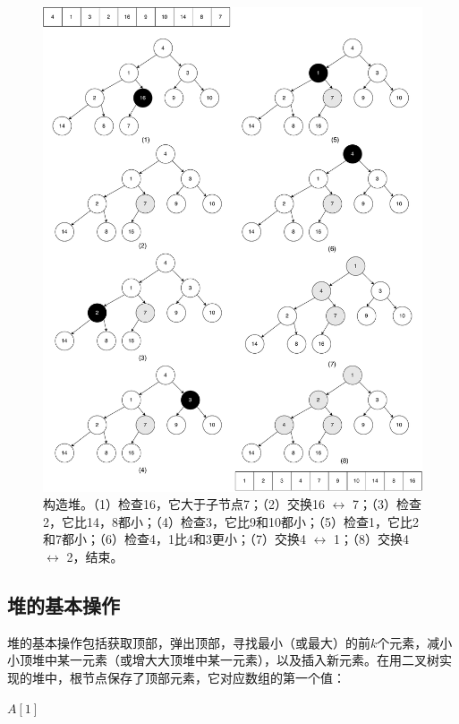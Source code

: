 \documentclass[b5paper]{ctexart}
\begin{document}
\begin{figure}[htbp]
  \centering
  \includegraphics[scale=0.4]{img/build-heap}
  \caption{构造堆。（1）检查16，它大于子节点7；（2）交换16 $\leftrightarrow$ 7；（3）检查2，它比14，8都小；（4）检查3，它比9和10都小；（5）检查1，它比2和7都小；（6）检查4，1比4和3更小；（7）交换4 $\leftrightarrow$ 1；（8）交换4 $\leftrightarrow$ 2，结束。}
  \label{fig:build-heap-3}
\end{figure}

\subsection{堆的基本操作}

堆的基本操作包括获取顶部，弹出顶部，寻找最小（或最大）的前$k$个元素，减小小顶堆中某一元素（或增大大顶堆中某一元素），以及插入新元素。在用二叉树实现的堆中，根节点保存了顶部元素，它对应数组的第一个值：

\begin{algorithmic}[1]
  \State \Return $A[1]$
\EndFunction
\end{algorithmic}
\end{document}
